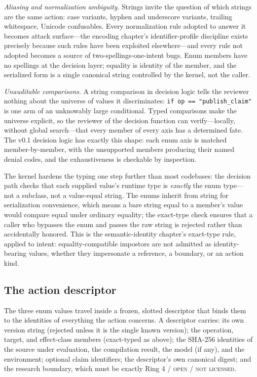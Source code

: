 \emph{Aliasing and normalization ambiguity.} Strings invite the question of which strings are the same action: case variants, hyphen and underscore variants, trailing whitespace, Unicode confusables. Every normalization rule adopted to answer it becomes attack surface---the encoding chapter's identifier-profile discipline exists precisely because such rules have been exploited elsewhere---and every rule not adopted becomes a source of two-spellings-one-intent bugs. Enum members have no spellings at the decision layer; equality is identity of the member, and the serialized form is a single canonical string controlled by the kernel, not the caller.

\emph{Unauditable comparisons.} A string comparison in decision logic tells the reviewer nothing about the universe of values it discriminates: \texttt{if op == "publish\_claim"} is one arm of an unknowably large conditional. Typed comparisons make the universe explicit, so the reviewer of the decision function can verify---locally, without global search---that every member of every axis has a determined fate. The v0.1 decision logic has exactly this shape: each enum axis is matched member-by-member, with the unsupported members producing their named denial codes, and the exhaustiveness is checkable by inspection.

The kernel hardens the typing one step further than most codebases: the decision path checks that each supplied value's runtime type is \emph{exactly} the enum type---not a subclass, not a value-equal string. The enums inherit from string for serialization convenience, which means a bare string equal to a member's value would compare equal under ordinary equality; the exact-type check ensures that a caller who bypasses the enum and passes the raw string is rejected rather than accidentally honored. This is the semantic-identity chapter's exact-type rule, applied to intent: equality-compatible impostors are not admitted as identity-bearing values, whether they impersonate a reference, a boundary, or an action kind.

\subsection{The action descriptor}\label{ch09:descriptor}

The three enum values travel inside a frozen, slotted descriptor that binds them to the identities of everything the action concerns. A descriptor carries: its own version string (rejected unless it is the single known version); the operation, target, and effect-class members (exact-typed as above); the SHA-256 identities of the source under evaluation, the compilation result, the model (if any), and the environment; optional claim identifiers; the descriptor's own canonical digest; and the research boundary, which must be exactly Ring 4 / \textsc{open} / \textsc{not licensed}.

